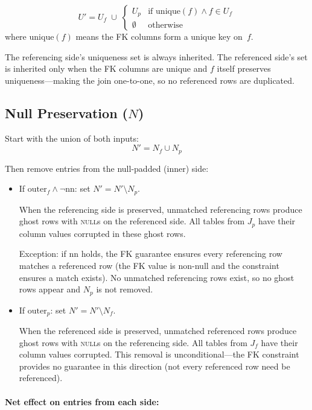 \documentclass[11pt]{article}
\theoremstyle{definition}
\newcommand{\Uf}{U_f}
\newcommand{\Up}{U_p}
\newcommand{\Nf}{N_f}
\newcommand{\Np}{N_p}
\newcommand{\Jf}{J_f}
\newcommand{\Jp}{J_p}
\newcommand{\outerf}{\mathrm{outer}_f}
\newcommand{\outerp}{\mathrm{outer}_p}
\newcommand{\nn}{\mathrm{nn}}
\newcommand{\unique}{\mathrm{unique}}
\begin{document}
\[
  U' = \Uf \;\cup\;
    \begin{cases}
      \Up & \text{if } \unique(f) \land f \in \Uf \\
      \emptyset & \text{otherwise}
    \end{cases}
\]
where $\unique(f)$ means the FK columns form a unique key on~$f$.

The referencing side's uniqueness set is always inherited.  The
referenced side's set is inherited only when the FK columns are unique
and $f$ itself preserves uniqueness---making the join one-to-one, so
no referenced rows are duplicated.


\subsection{Null Preservation (\texorpdfstring{$N$}{N})}

Start with the union of both inputs:
\[
  N' = \Nf \cup \Np
\]

Then remove entries from the null-padded (inner) side:

\begin{itemize}
\item If $\outerf \land \lnot\nn$: set $N' = N' \setminus \Np$.

  When the referencing side is preserved, unmatched referencing rows
  produce ghost rows with \textsc{null}s on the referenced side.  All
  tables from $\Jp$ have their column values corrupted in these ghost
  rows.

  Exception: if $\nn$ holds, the FK guarantee ensures every
  referencing row matches a referenced row (the FK value is non-null
  and the constraint ensures a match exists).  No unmatched
  referencing rows exist, so no ghost rows appear and $\Np$ is not
  removed.

\item If $\outerp$: set $N' = N' \setminus \Nf$.

  When the referenced side is preserved, unmatched referenced rows
  produce ghost rows with \textsc{null}s on the referencing side.
  All tables from $\Jf$ have their column values corrupted.  This
  removal is unconditional---the FK constraint provides no guarantee
  in this direction (not every referenced row need be referenced).
\end{itemize}

\paragraph{Net effect on entries from each side:}
\end{document}
